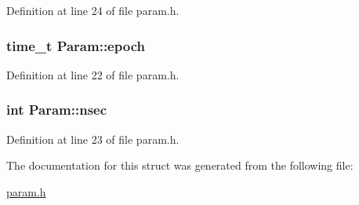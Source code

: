 Definition at line 24 of file param.h.\hypertarget{structParam_a2d1c3d20d5301e6cbfebbaaa6c1aa2b6}{
\subsubsection[{epoch}]{\setlength{\rightskip}{0pt plus 5cm}time\_\-t {\bf Param::epoch}}}
\label{structParam_a2d1c3d20d5301e6cbfebbaaa6c1aa2b6}


Definition at line 22 of file param.h.\hypertarget{structParam_ac93892391ad74849738e22ed6210c746}{
\subsubsection[{nsec}]{\setlength{\rightskip}{0pt plus 5cm}int {\bf Param::nsec}}}
\label{structParam_ac93892391ad74849738e22ed6210c746}


Definition at line 23 of file param.h.

The documentation for this struct was generated from the following file:\begin{DoxyCompactItemize}
\item 
\hyperlink{param_8h}{param.h}\end{DoxyCompactItemize}
